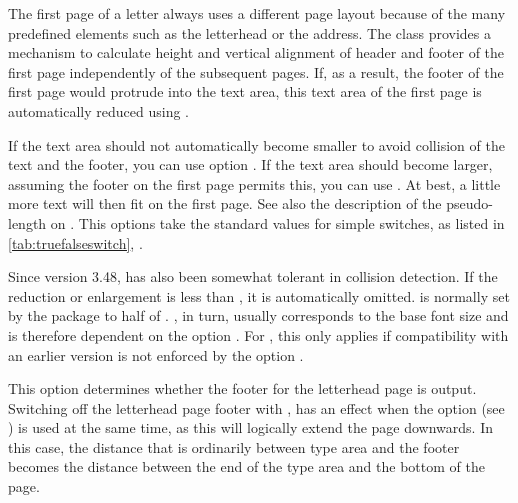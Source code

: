 \begin{Declaration}
\end{Declaration}
\begin{Explain}
  The first page of a letter always uses a different page layout because of
  the many predefined elements such as the letterhead or the address. The
   class provides a mechanism to calculate height and vertical
  alignment of header and footer of the first page independently of the
  subsequent pages. If, as a result, the footer of the first page would
  protrude into the text area, this text area of the first page is
  automatically reduced using
  .
\end{Explain}
If the text area
should not automatically become smaller to avoid collision of the text and the
footer, you can use option %
.  If the text area should
become larger, assuming the footer on the first page permits this, you can use
%
. At best, a little more text
will then fit on the first page. See also the description of the
 pseudo-length on
.  This options take the
standard values for simple switches, as listed in
\autoref{tab:truefalseswitch}, .

Since version 3.48,
\KOMAScript{} has also been somewhat tolerant in collision detection. If the
reduction or enlargement is less than , it is automatically
omitted.  is normally set by the  package
to half of . , in turn, usually corresponds to
the base font size and is therefore dependent on the option
. For , this only applies
if compatibility with an earlier version is not enforced by the option
.%
\EndIndexGroup


\begin{Declaration}
\end{Declaration}
%
This option determines whether the footer
for the letterhead page is output. Switching off the letterhead page footer
with ,
has an effect when the  option 
(see ) is used at the same
time, as this will logically extend the page downwards. In this case, the
distance that is ordinarily between type area and the footer becomes the
distance between the end of the type area and the bottom of the page.

